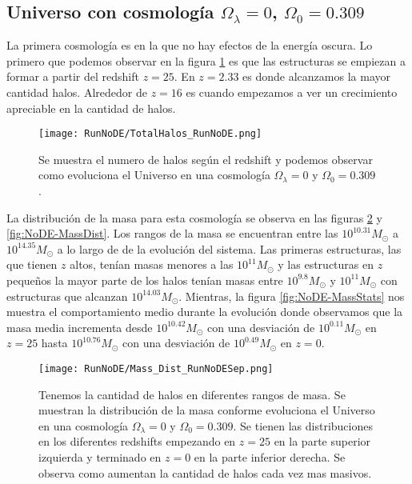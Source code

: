 
\subsection{Universo con cosmología \texorpdfstring{$\Omega_\lambda = 0$, $\Omega_0 = 0.309$ }{Omega lambda = 0, Omega 0 = 0.309}  }

La primera cosmología es en la que no hay efectos de la energía oscura. Lo primero que podemos observar en la figura \ref{fig:NoDE_TotalHalos} es que las estructuras se empiezan a formar a partir del redshift $z=25$. En $z= 2.33$ es donde alcanzamos la mayor cantidad halos. Alrededor de $z = 16$ es cuando empezamos a ver un crecimiento apreciable en la cantidad de halos.

\begin{figure}[H]
    \centering
    \texttt{[image: RunNoDE/TotalHalos\_RunNoDE.png]}
    \caption[Evolución del número de halos en un Universo $\Omega_\lambda = 0$, $\Omega_0 = 0.309$]{\footnotesize Se muestra el numero de halos según el redshift y podemos observar como evoluciona el Universo en una cosmología $\Omega_\lambda = 0$ y $\Omega_0 = 0.309$.}
    \label{fig:NoDE_TotalHalos}
\end{figure}

La distribución de la masa para esta cosmología se observa en las figuras \ref{fig:NoDE-MassDistSep} y \ref{fig:NoDE-MassDist}. Los rangos de la masa se encuentran entre las $10^{10.31}M_\odot$ a $10^{14.35}M_\odot$ a lo largo de de la evolución del sistema. Las primeras estructuras, las que tienen $z$ altos, tenían masas menores a las $10^{11}M_\odot$ y las estructuras en $z$ pequeños la mayor parte de los halos tenían masas entre $10^{9.8}M_\odot$ y $10^{11}M_\odot$ con estructuras que alcanzan $10^{14.03}M_\odot$. Mientras, la figura \ref{fig:NoDE-MassStats} nos muestra el comportamiento medio durante la evolución donde observamos que la masa media incrementa desde $10^{10.42}M_\odot$ con una desviación de $10^{0.11}M_\odot$ en $z=25$ hasta $10^{10.76}M_\odot$ con una desviación de $10^{0.49}M_\odot$ en $z=0$.

\begin{figure}[H]
    \centering
    \texttt{[image: RunNoDE/Mass\_Dist\_RunNoDESep.png]}
    \caption[Distribución de masa]{\footnotesize Tenemos la cantidad de halos en diferentes rangos de masa. Se muestran la distribución de la masa conforme evoluciona el Universo en una cosmología $\Omega_\lambda = 0$ y $\Omega_0 = 0.309$. Se tienen las distribuciones en los diferentes redshifts empezando en $z=25$ en la parte superior izquierda y terminado en $z=0$ en la parte inferior derecha. Se observa como aumentan la cantidad de halos cada vez mas masivos.}
    \label{fig:NoDE-MassDistSep}
\end{figure}

